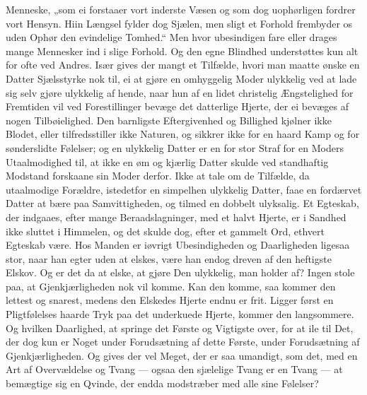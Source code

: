 \documentclass[12pt,a4paper]{book}
\newcommand{\apage}[1]{\marginnote{\footnotesize\textit{[#1]}}}
\begin{document}
Menneske, „som ei forstaaer vort inderste Væsen og som dog uophørligen
fordrer vort Hensyn. Hiin Længsel fylder dog Sjælen, men sligt et
Forhold frembyder os uden Ophør den evindelige \apage{73} Tomhed.“ Men hvor
ubesindigen fare eller drages mange Mennesker ind i slige Forhold. Og
den egne Blindhed understøttes kun alt for ofte ved Andres. Især gives
der mangt et Tilfælde, hvori man maatte ønske en Datter Sjælsstyrke nok
til, ei at gjøre en omhyggelig Moder ulykkelig ved at lade sig selv
gjøre ulykkelig af hende, naar hun af en lidet christelig Ængstelighed
for Fremtiden vil ved Forestillinger bevæge det datterlige Hjerte, der
ei bevæges af nogen Tilbøielighed. Den barnligste Eftergivenhed og
Billighed kjølner ikke Blodet, eller tilfredsstiller ikke Naturen, og
sikkrer ikke for en haard Kamp og for sønderslidte Følelser; og en
ulykkelig Datter er en for stor Straf for en Moders Utaalmodighed til,
at ikke en øm og kjærlig Datter skulde ved standhaftig Modstand
forskaane sin Moder derfor. Ikke at tale om de Tilfælde, da utaalmodige
Forældre, istedetfor en simpelhen ulykkelig Datter, faae en fordærvet
Datter at bære paa Samvittigheden, og tilmed en dobbelt ulyksalig. Et
Egteskab, der indgaaes, efter mange Beraadslagninger, med et halvt
Hjerte, er i Sandhed ikke sluttet i Himmelen, og det skulde dog, efter
et gammelt Ord, ethvert Egteskab være. Hos Manden er iøvrigt
Ubesindigheden og Daarligheden ligesaa stor, naar han egter uden at
elskes, være han endog dreven af den heftigste Elskov. Og er det da at
elske, at gjøre Den ulykkelig, man holder af? Ingen stole paa, at
Gjenkjærligheden nok vil komme. Kan den komme, saa kommer den lettest og
snarest, medens \apage{74} den Elskedes Hjerte endnu er frit. Ligger først en
Pligtfølelses haarde Tryk paa det underkuede Hjerte, kommer den
langsommere. Og hvilken Daarlighed, at springe det Første og Vigtigste
over, for at ile til Det, der dog kun er Noget under Forudsætning af
dette Første, under Forudsætning af Gjenkjærligheden. Og gives der vel
Meget, der er saa umandigt, som det, med en Art af Overvældelse og Tvang
--- ogsaa den sjælelige Tvang er en Tvang --- at bemægtige sig en
Qvinde, der endda modstræber med alle sine Følelser?
\end{document}
